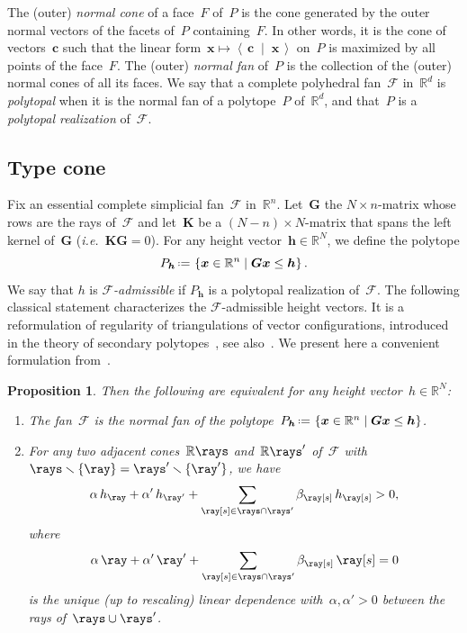 \documentclass{amsart}
\newtheorem{proposition}[theorem]{Proposition}
\theoremstyle{definition}
\newcommand{\R}{\mathbb{R}} %
\renewcommand{\b}[1]{{\boldsymbol{#1}}} %
\newcommand{\set}[2]{\left\{ #1 \;\middle|\; #2 \right\}} %
\newcommand{\ssm}{\smallsetminus} %
\newcommand{\dotprod}[2]{\left\langle \, #1 \; \middle| \; #2 \, \right\rangle} %
\newcommand{\eqdef}{\mbox{\,\raisebox{0.2ex}{\scriptsize\ensuremath{\mathrm:}}\ensuremath{=}\,}} %
\newcommand{\ie}{\textit{i.e.}~} %
\newcommand{\darkblue}{\color{darkblue}} %
\newcommand{\defn}[1]{\textsl{\darkblue #1}} %
\newcommand{\Fan}{\mathcal{F}} %
\begin{document}
The (outer) \defn{normal cone} of a face~$F$ of~$P$ is the cone generated by the outer normal vectors of the facets of~$P$ containing~$F$.
In other words, it is the cone of vectors~$\b{c}$ such that the linear form~${\b{x} \mapsto \dotprod{\b{c}}{\b{x}}}$ on~$P$ is maximized by all points of the face~$F$.
The (outer) \defn{normal fan} of~$P$ is the collection of the (outer) normal cones of all its faces.
We say that a complete polyhedral fan~$\Fan$ in~$\R^d$ is \defn{polytopal} when it is the normal fan of a polytope~$P$ of~$\R^d$, and that~$P$ is a \defn{polytopal realization} of~$\Fan$.


\subsection{Type cone}

Fix an essential complete simplicial fan~$\Fan$ in~$\R^n$. Let~$\b{G}$ the $N \times n$-matrix whose rows are the rays of~$\Fan$ and let~$\b{K}$ be a $(N-n) \times N$-matrix that spans the left kernel of~$\b{G}$ (\ie $\b{K}\b{G} = 0$). For any height vector~$\b{h} \in \R^N$, we define the polytope
\[
P_\b{h} \eqdef \set{\b{x} \in \R^n}{\b{G}\b{x} \le \b{h}}.
\]
We say that $h$ is \defn{$\Fan$-admissible} if $P_\b{h}$ is a polytopal realization of~$\Fan$.
The following classical statement characterizes the $\Fan$-admissible height vectors.
It is a reformulation of regularity of triangulations of vector configurations, introduced in the theory of secondary polytopes~\cite{GelfandKapranovZelevinsky}, see also~\cite{DeLoeraRambauSantos}.
We present here a convenient formulation from~\cite[Lem.~2.1]{ChapotonFominZelevinsky}.

\begin{proposition}
\label{prop:characterizationPolytopalFan}
Then the following are equivalent for any height vector~$h \in \R^N$:
\begin{enumerate}
\item The fan~$\Fan$ is the normal fan of the polytope~$P_\b{h} \eqdef \set{\b{x} \in \R^n}{\b{G}\b{x} \le \b{h}}$.
\item For any two adjacent cones~$\R \rays$ and~$\R \rays'$ of~$\Fan$ with~$\rays \ssm \{\ray\} = \rays' \ssm \{\ray'\}$, we have
\[
\alpha \, h_{\ray} + \alpha' \, h_{\ray'} + \sum_{\ray[s] \in \rays \cap \rays'} \beta_{\ray[s]} \, h_{\ray[s]} > 0,
\]
where
\[
\alpha \, \ray + \alpha' \, \ray' + \sum_{\ray[s] \in \rays \cap \rays'} \beta_{\ray[s]} \, \ray[s] = 0
\]
is the unique (up to rescaling) linear dependence with~$\alpha, \alpha' > 0$ between the rays of~$\rays \cup \rays'$.
\end{enumerate}
\end{proposition}
\end{document}
